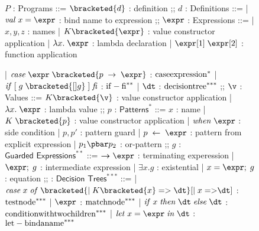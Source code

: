 \documentclass[manuscript,screen,review, 12pt]{acmart}
\begin{document}

\begin{figure}[h!p]
    \small
    \begin{flushleft}
        \begin{bnf}
        $P$ : \textsf{Programs} ::=
        $\bracketed{d}$ : definition
        ;;
        $d$ : \textsf{Definitions} ::=
        | $\mathit{val}\; x\; \mathit{=}\; \expr$ : bind name to expression
        ;;
        $\expr$ : Expressions ::= 
        | $x, y, z$             : names
        | $K\bracketed{\expr}$  : value constructor application 
        | $\lambda x.\; \expr$  : lambda declaration  
        | $\expr[1]\; \expr[2]$ : function application 
    
        | $\mathit{case}\; \expr\; \bracketed{p\; \rightarrow\; \expr}$ : $\rm{case expression}^{*}$
        | $\mathit{if}\; \mathit{[}\; g\; 
            \bracketed{[] g}\; \mathit{]}\; \mathit{fi}$                : $\rm{if-fi}^{**}$
        | $\dt$                                                         : $\rm{decision tree}^{***}$
        ;;
        $\v$ : Values ::= 
          $K\bracketed{\v}$     : value constructor application 
        | $\lambda x.\; \expr$  : lambda value 
        ;;
        $p$ : $\textsf{Patterns}^{*}$ ::= 
        $x$ : name 
        | $K\; \bracketed{p}$           : value constructor application 
        | $\mathit{when}\; \expr$       : side condition
        | $p, p'$                       : pattern guard 
        | $p\; \leftarrow\; \expr$      : pattern from explicit expression  
        | $p_{1}\pbar p_{2}$            : or-pattern
        ;;
        $g$ : $\textsf{Guarded Expressions}^{**}$ ::=  
        $\boldsymbol{\rightarrow}\expr$ : terminating experession
        | $\expr;\; g$                  : intermediate expression 
        | $\exists x \mathit{.} g$      : existential 
        | $x = \expr;\; g$              : equation 
        ;;
        \dt : $\textsf{Decision Trees}^{***}$ ::= 
        | $\mathit{case}\; x\; \mathit{of}\; 
            \bracketed{\vert\; K\bracketed{x}\; \mathit{=>}\; \dt} 
            [\vert\; x\; \mathit{=>} \dt]$                              : $\rm{test node }^{***}$
        | $\expr$                                                       : $\rm{match node }^{***}$
        | $\mathit{if}\; x\; \mathit{then}\; \dt\; \mathit{else}\; \dt$ : $\rm{condition with two children }^{***}$
        | $\mathit{let}\; x\; \mathit{=}\; \expr\; \mathit{in}\; \dt$   : $\rm{let-bind a name}^{***}$
        \end{bnf}
        \medskip
        

\end{flushleft}
\end{figure}
\end{document}
